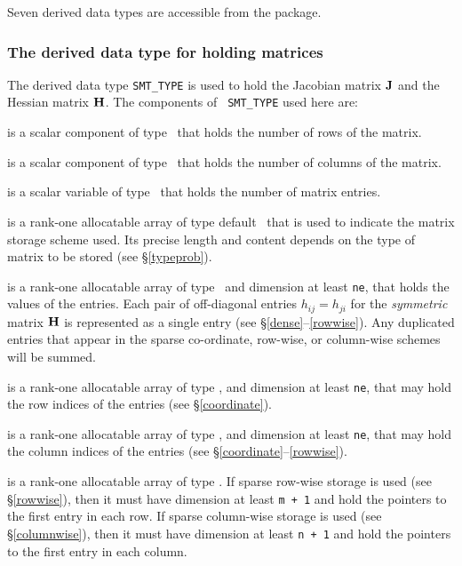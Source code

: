 \documentclass{galahad}
\begin{document}




\galtypes
Seven derived data types are accessible from the package.


\subsubsection{The derived data type for holding matrices}\label{typesmt}
The derived data type {\tt SMT\_TYPE} is used to hold the Jacobian
matrix ${\mathbf{J}}$ and the Hessian matrix ${\mathbf{H}}$. The components of {\tt
  SMT\_TYPE} used here are:

\begin{description}

 is a scalar component of type \integer\ 
that holds the number of rows of the matrix. 

 is a scalar component of type \integer\ 
that holds the number of columns of the matrix. 
 
 is a scalar variable of type \integer\ that
holds the number of matrix entries.

 is a rank-one allocatable array of type default \character\ that
is used to indicate the matrix storage scheme used. Its precise length and
content depends on the type of matrix to be stored (see \S\ref{typeprob}).

\ittf{val} is a rank-one allocatable array of type \realdp\, 
and dimension at least {\tt ne}, that holds the values of the entries. 
Each pair of off-diagonal entries $h_{ij} = h_{ji}$ for the {\em symmetric}
matrix ${\mathbf{H}}$ is represented as a single entry 
(see \S\ref{dense}--\ref{rowwise}).
Any duplicated entries that appear in the sparse 
co-ordinate, row-wise, or column-wise schemes will be summed. 

 is a rank-one allocatable array of type \integer, 
and dimension at least {\tt ne}, that may hold the row indices of the entries 
(see \S\ref{coordinate}).

 is a rank-one allocatable array of type \integer, 
and dimension at least {\tt ne}, that may hold the column indices of the entries
(see \S\ref{coordinate}--\ref{rowwise}).

 is a rank-one allocatable array of type \integer.
If sparse row-wise storage is used (see \S\ref{rowwise}), then it
must have dimension at least {\tt m + 1} and hold the pointers to
the first entry in each row.  If sparse column-wise storage is used (see \S\ref{columnwise}), then it
must have dimension at least {\tt n + 1} and hold the pointers to
the first entry in each column.   

\end{description}
\end{document}
